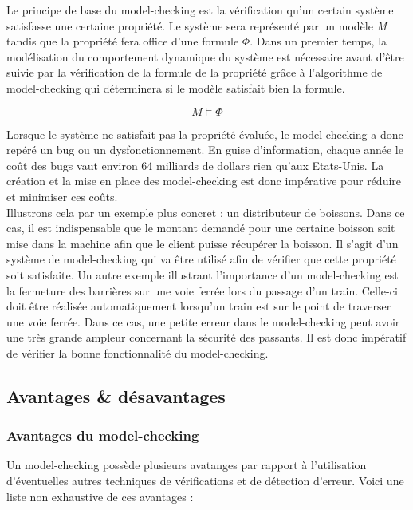\documentclass[runningheads,a4paper,11pt]{llncs}
\begin{document}
\noindent
Le principe de base du model-checking est la vérification qu'un certain système satisfasse une certaine propriété. Le système sera représenté par un modèle \textit{M} tandis que la propriété fera office d'une formule $\Phi$. Dans un premier temps, la modélisation du comportement dynamique du système est nécessaire avant d'être suivie par la vérification de la formule de la propriété grâce à l'algorithme de model-checking qui déterminera si le modèle satisfait bien la formule.  

$$\boxed{\textit{M} \vDash \Phi}$$

\noindent
Lorsque le système ne satisfait pas la propriété évaluée, le model-checking a donc repéré un bug ou un dysfonctionnement. En guise d'information, chaque année le coût des bugs vaut environ 64 milliards de dollars rien qu'aux Etats-Unis. La création et la mise en place des model-checking est donc impérative pour réduire et minimiser ces coûts.  \\

\noindent
Illustrons cela par un exemple plus concret : un distributeur de boissons. Dans ce cas, il est indispensable que le montant demandé pour une certaine boisson soit mise dans la machine afin que le client puisse récupérer la boisson. Il s'agit d'un système de model-checking qui va être utilisé afin de vérifier que cette propriété soit satisfaite. 
Un autre exemple illustrant l'importance d'un model-checking est la fermeture des barrières sur une voie ferrée lors du passage d'un train. 
Celle-ci doit être réalisée automatiquement lorsqu'un train est sur le point de traverser une voie ferrée. Dans ce cas, une petite erreur dans le model-checking peut avoir une très grande ampleur concernant la sécurité des passants. Il est donc impératif de vérifier la bonne fonctionnalité du model-checking. 


\noindent 
\subsection{Avantages \& désavantages}

\subsubsection{Avantages du model-checking}

Un model-checking possède plusieurs avatanges par rapport à l'utilisation d'éventuelles autres techniques de vérifications et de détection d'erreur. Voici une liste non exhaustive de ces avantages : 
\end{document}
